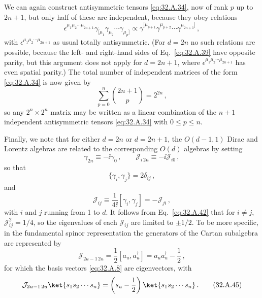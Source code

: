 We can again construct antisymmetric tensors \eqref{eq:32.A.34}, now of rank
\(p\) up to \(2n+1\), but only half of these are independent, because they
obey relations
\begin{equation}
  \epsilon^{\mu_1\mu_2\cdots\mu_{2n+1}}
  \gamma_{[\mu_1}\gamma_{\mu_2}\cdots\gamma_{\mu_p]}
  \propto
  \gamma^{[\mu_{p+1}}\gamma^{\mu_{p+2}}\cdots\gamma^{\mu_{2n+1}]}\,,
  \tag{32.A.39}\label{eq:32.A.39}
\end{equation}
with \(\epsilon^{\mu_1\mu_2\cdots\mu_{2n+1}}\) as usual totally
antisymmetric. (For \(d=2n\) no such relations are possible, because the
left- and right-hand sides of Eq.~\eqref{eq:32.A.39} have opposite parity,
but this argument does not apply for \(d=2n+1\), where
\(\epsilon^{\mu_1\mu_2\cdots\mu_{2n+1}}\) has even spatial parity.) The
total number of independent matrices of the form \eqref{eq:32.A.34} is now
given by
\begin{equation}
  \sum_{p=0}^{n}\binom{2n+1}{p}=2^{2n}\,,
  \tag{32.A.40}\label{eq:32.A.40}
\end{equation}
so any \(2^n\times2^n\) matrix may be written as a linear combination of the
\(n+1\) independent antisymmetric tensors \eqref{eq:32.A.34} with
\(0\le p\le n\).

Finally, we note that for either \(d=2n\) or \(d=2n+1\), the \(O(d-1,1)\)
Dirac and Lorentz algebras are related to the corresponding \(O(d)\)
algebras by setting
\begin{equation}
  \gamma_{2n}\equiv-\ii\gamma_0\,,
  \qquad
  \mathcal J_{i\,2n}\equiv-\ii\mathcal J_{i0}\,,
  \tag{32.A.41}\label{eq:32.A.41}
\end{equation}
so that
\begin{equation}
  \{\gamma_i,\gamma_j\}=2\delta_{ij}\,,
  \tag{32.A.42}\label{eq:32.A.42}
\end{equation}
and
\begin{equation}
  \mathcal J_{ij}
  \equiv\frac{1}{4\ii}[\gamma_i,\gamma_j]
  =-\mathcal J_{ji}\,,
  \tag{32.A.43}\label{eq:32.A.43}
\end{equation}
with \(i\) and \(j\) running from 1 to \(d\). It follows from
Eq.~\eqref{eq:32.A.42} that for \(i\ne j\),
\(\mathcal J_{ij}^2=1/4\), so the eigenvalues of each \(\mathcal J_{ij}\)
are limited to \(\pm1/2\). To be more specific, in the fundamental spinor
representation the generators of the Cartan subalgebra are represented by
\begin{equation}
  \mathcal J_{2u-1\,2u}
  =\frac{1}{2}[a_u,a_u^\dagger]
  =a_ua_u^\dagger-\frac{1}{2}\,,
  \tag{32.A.44}\label{eq:32.A.44}
\end{equation}
for which the basis vectors \eqref{eq:32.A.8} are eigenvectors, with
\begin{equation}
  \mathcal J_{2u-1\,2u}\ket{s_1s_2\cdots s_n}
  =\left(s_u-\frac{1}{2}\right)\ket{s_1s_2\cdots s_n}\,.
  \tag{32.A.45}\label{eq:32.A.45}
\end{equation}

